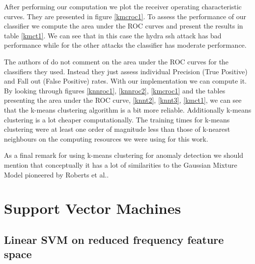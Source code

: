 \documentclass[reqno,openany,12pt]{amsbook}
\begin{document}
After performing our computation we plot the receiver operating characteristic curves. They are presented in figure \ref{kmcroc1}. To assess the performance of our classifier we compute the area under the ROC curves and present the results in table \ref{kmct1}. We can see that in this case the hydra ssh attack has bad performance while for the other attacks the classifier has moderate performance.

The authors of \cite{adf1} do not comment on the area under the ROC curves for the classifiers they used.
Instead they just assess individual Precision (True Positive) and Fall out (False Positive) rates. With our implementation we can compute it.
By looking through figures \ref{knnroc1}, \ref{knnroc2}, \ref{kmcroc1} and the tables presenting the area under the ROC curve, \ref{knnt2}, \ref{knnt3}, \ref{kmct1}, we can see that the k-means clustering algorithm is a bit more reliable.
Additionally k-means clustering is a lot cheaper computationally. The training times for k-means clustering were at least one order of magnitude less  than those of k-nearest neighbours on the computing resources we were using for this work.

As a final remark for using k-means clustering for anomaly detection we should mention that conceptually it has a lot of similarities to the Gaussian Mixture Model pioneered by Roberts et al.\cite{out1}.


\section{Support Vector Machines}

\subsection{Linear SVM on reduced frequency feature space}\mbox{}
\end{document}
